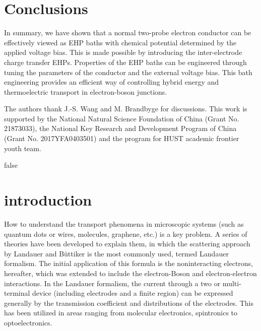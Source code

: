 \documentclass[aps,prb,
,floatfix,footinbib,shortbibliography,
preprint
]{revtex4-1}
\newcommand{\revision}[1]{{\color{blue}{#1}}}
\begin{document}
\section{Conclusions}
In summary, we have shown that a normal two-probe electron conductor can be effectively viewed as EHP baths with chemical potential determined by the applied voltage bias. This is made possible by introducing the inter-electrode charge transfer EHPs. Properties of the EHP baths can be engineered through tuning the parameters of the conductor and the external voltage bias. This bath engineering provides an efficient way of controlling hybrid energy and thermoelectric transport in electron-boson junctions. 


\begin{acknowledgements}
The authors thank J.-S. Wang and M. Brandbyge for discussions. This work is supported by the National Natural Science Foundation of China
(Grant No. 21873033), the National Key Research and Development Program of China
(Grant No. 2017YFA0403501) and the program for HUST academic frontier youth team.
\end{acknowledgements}
\if false
\clearpage
\appendix
\section{introduction}
How to understand the transport phenomena in microscopic systems (such as quantum dots or wires, molecules, graphene, etc.) is a key problem. A series of
theories have been developed to explain them, in which the scattering approach by Landauer\cite{landauer1957spatial} and B\"{u}ttiker\cite{buttiker1986four} is the most commonly used, termed Landauer formalism. The initial application of this formula is the noninteracting electrons, hereafter, which was extended to include the electron-Boson and electron-electron interactions\cite{meir1992landauer,jauho1994time,lu2007coupled}.
In the Landauer formalism, the current through a two or multi- terminal device (including electrodes and a finite region) can be expressed generally by the transmission coefficient and distributions of the electrodes. This has been utilized in areas ranging from molecular electronics, spintronics to optoelectronics\cite{galperin2007molecular,haug2008quantum,galperin2012molecular}.
\end{document}
